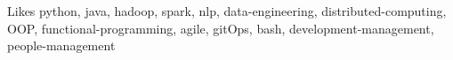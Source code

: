

\begin{cvskills}

  \cvskill
    {Likes} %
    {python, java, hadoop, spark, nlp, data-engineering, distributed-computing, OOP, functional-programming, agile, gitOps, bash, development-management, people-management} %


\end{cvskills}
